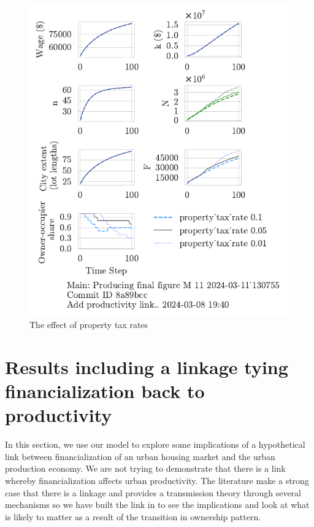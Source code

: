 \begin{figure}[h!tb]
    \centering
    \includegraphics[scale=.8, trim={0 1.4cm 0 0},clip]{fig/property_tax_rate-Main-130755.pdf}
    \caption{The effect of property tax rates}
    \label{fig:property_tax_ownership_trajectory}
\end{figure}

\section{Results including a linkage tying financialization back to productivity}

In this section, we use our model to explore some implications of a hypothetical link between financialization of an urban housing market and the urban production economy. We are not trying to demonstrate that there is a link whereby financialization affects urban productivity. The literature make a strong case that there is a linkage and provides a transmission theory through several mechanisms so we have built the link in to see the implications and look at what is likely to matter as a result of the transition in ownership pattern.

